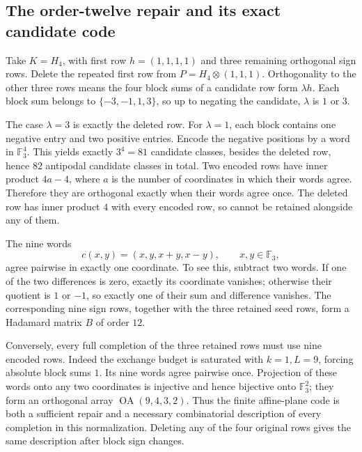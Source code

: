 \subsection{The order-twelve repair and its exact candidate code}
Take $K=H_4$, with first row $h=(1,1,1,1)$ and three remaining
orthogonal sign rows. Delete the repeated first row from
$P=H_4\otimes(1,1,1)$. Orthogonality to the other three rows means
the four block sums of a candidate row form $\lambda h$.
Each block sum belongs to $\{-3,-1,1,3\}$, so up to negating the
candidate, $\lambda$ is $1$ or $3$.

The case $\lambda=3$ is exactly the deleted row. For $\lambda=1$,
each block contains one negative entry and two positive entries.
Encode the negative positions by a word in $\mathbb F_3^4$.
This yields exactly $3^4=81$ candidate classes, besides the deleted
row, hence $82$ antipodal candidate classes in total.
Two encoded rows have inner product $4a-4$, where $a$ is the number
of coordinates in which their words agree. Therefore they are
orthogonal exactly when their words agree once. The deleted row
has inner product $4$ with every encoded row, so cannot be retained
alongside any of them.

The nine words
\[
 c(x,y)=(x,y,x+y,x-y),\qquad x,y\in\mathbb F_3,
\]
agree pairwise in exactly one coordinate. To see this, subtract two
words. If one of the two differences is zero, exactly its coordinate
vanishes; otherwise their quotient is $1$ or $-1$, so exactly one
of their sum and difference vanishes. The corresponding nine sign
rows, together with the three retained seed rows, form a Hadamard
matrix $B$ of order $12$.

Conversely, every full completion of the three retained rows must
use nine encoded rows. Indeed the exchange budget is saturated with
$k=1,L=9$, forcing absolute block sums $1$. Its nine words agree
pairwise once. Projection of these words onto any two coordinates is
injective and hence bijective onto $\mathbb F_3^2$; they form an
orthogonal array $\operatorname{OA}(9,4,3,2)$.
Thus the finite affine-plane code is both a sufficient repair and a
necessary combinatorial description of every completion in this
normalization. Deleting any of the four original rows gives the same
description after block sign changes.

